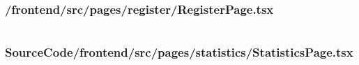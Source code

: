 \subsubsection{/frontend/src/pages/register/RegisterPage.tsx}
\inputminted{typescript}{SourceCode/frontend/src/pages/register/RegisterPage.tsx}
\subsubsection{SourceCode/frontend/src/pages/statistics/StatisticsPage.tsx}
\inputminted{typescript}{SourceCode/frontend/src/pages/statistics/StatisticsPage.tsx}






